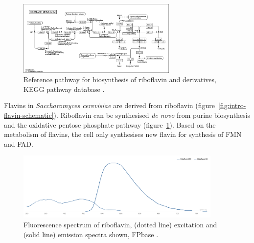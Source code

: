 \begin{figure}
  \centering
  \includegraphics[width=0.7\textwidth]{kegg-flavin}
  \caption{
    Reference pathway for biosynthesis of riboflavin and derivatives, KEGG pathway database \citep{kanehisaKEGGTaxonomybasedAnalysis2023}.
    }
  \label{fig:intro-flavin-kegg}
\end{figure}

Flavins in \emph{Saccharomyces cerevisiae} are derived from riboflavin (figure~\ref{fig:intro-flavin-schematic}).
Riboflavin can be synthesised \emph{de novo} from purine biosynthesis and the oxidative pentose phosphate pathway (figure~\ref{fig:intro-flavin-kegg}).
Based on the metabolism of flavins, the cell only synthesises new flavin for synthesis of FMN and FAD.

\begin{figure}
  \centering
  \includegraphics[width=0.9\textwidth]{fpbase-riboflavin}
  \caption{
    Fluorescence spectrum of riboflavin, (dotted line) excitation and (solid line) emission spectra shown, FPbase \citep{lambertUsingFPbaseFluorescent2023}.
    }
  \label{fig:intro-flavin-spectra}
\end{figure}

